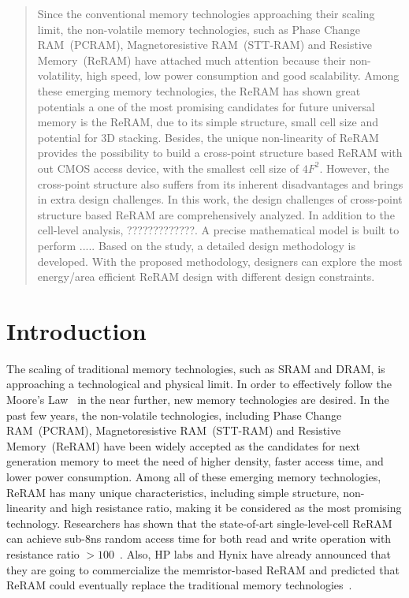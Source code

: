 \begin{abstract}
Since the conventional memory technologies approaching their scaling limit, the non-volatile memory technologies, such as Phase Change RAM~(PCRAM), Magnetoresistive RAM~(STT-RAM) and Resistive Memory~(ReRAM) have attached much attention because their non-volatility, high speed, low power consumption and good scalability. Among these emerging memory technologies, the ReRAM has shown great potentials a one of the most promising candidates for future universal memory is the ReRAM, due to its simple structure, small cell size and potential for 3D stacking. Besides, the unique non-linearity of ReRAM provides the possibility to build a cross-point structure based ReRAM with out CMOS access device, with the smallest cell size of $4F^2$. However, the cross-point structure also suffers from its inherent disadvantages and brings in extra design challenges. In this work, the design challenges of cross-point structure based ReRAM are comprehensively analyzed. In addition to the cell-level analysis, ?????????????. A precise mathematical model is built to perform ..... Based on the study, a detailed design methodology is developed. With the proposed methodology, designers can explore the most energy/area efficient ReRAM design with different design constraints.
\end{abstract}

\section{Introduction}\label{sec:intro}
The scaling of traditional memory technologies, such as SRAM and DRAM, is approaching a technological and physical limit. In order to effectively follow the Moore's Law~\cite{moore} in the near further, new memory technologies are desired. In the past few years, the non-volatile technologies, including Phase Change RAM~(PCRAM), Magnetoresistive RAM~(STT-RAM) and Resistive Memory~(ReRAM) have been widely accepted as the candidates for next generation memory to meet the need of higher density, faster access time, and lower power consumption. Among all of these emerging memory technologies, ReRAM has many unique characteristics, including simple structure, non-linearity and high resistance ratio, making it be considered as the most promising technology. Researchers has shown that the state-of-art single-level-cell ReRAM can achieve sub-8ns random access time for both read and write operation with resistance ratio $>100$~\cite{memristor:ISSCC2011_ITRI}. Also, HP labs and Hynix have already announced that they are going to commercialize the memristor-based ReRAM and predicted that ReRAM could eventually replace the traditional memory technologies~\cite{memristor:HpHynix}.

